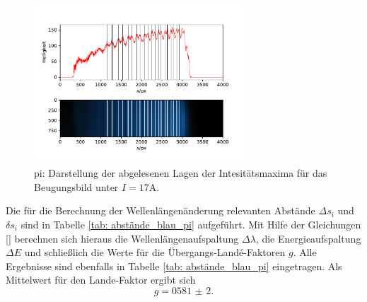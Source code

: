 \begin{figure}
  \centering
  \includegraphics[width = 0.7\textwidth]{../Messdaten/plots/peaks_blau_pi_17.pdf}
  \caption{pi: Darstellung der abgelesenen Lagen der Intesitätsmaxima für das Beugungsbild unter $I =17$A.}
  \label{fig: peaks_blau_pi_17}
\end{figure}
Die für die Berechnung der Wellenlängenänderung relevanten Abstände $\Delta s_i$ und $\delta s_i$ sind in Tabelle \ref{tab: abstände_blau_pi}
aufgeführt. Mit Hilfe der Gleichungen \eqref{} berechnen sich hieraus die Wellenlängenaufspaltung $\Delta \lambda$, die
Energieaufspaltung $\Delta E$ und schließlich die Werte für die Übergangs-Landé-Faktoren $g$. Alle Ergebnisse sind ebenfalls in
Tabelle \ref{tab: abstände_blau_pi} eingetragen. Als Mittelwert für den Lande-Faktor ergibt sich
\begin{equation}
  g = \num{0581(2)}.
\end{equation}

